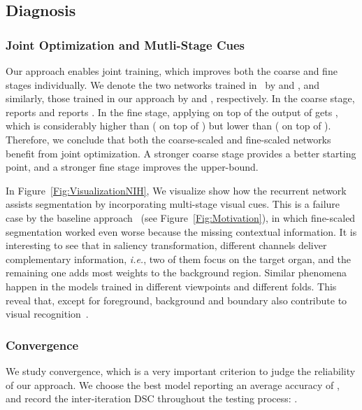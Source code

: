 \documentclass[10pt,twocolumn,letterpaper]{article}
\begin{document}
\subsection{Diagnosis}
\label{ExperimentsNIH:Diagnosis}


\subsubsection{Joint Optimization and Mutli-Stage Cues}
\label{ExperimentsNIH:Diagnosis:JointOptimization}

Our approach enables joint training, which improves both the coarse and fine stages individually.
We denote the two networks trained in~\cite{Zhou_2017_Fixed} by  and ,
and similarly, those trained in our approach by  and , respectively.
In the coarse stage,  reports  and  reports .
In the fine stage, applying  on top of the output of  gets ,
which is considerably higher than  ( on top of )
but lower than  ( on top of ).
Therefore, we conclude that both the coarse-scaled and fine-scaled networks benefit from joint optimization.
A stronger coarse stage provides a better starting point, and a stronger fine stage improves the upper-bound.

In Figure~\ref{Fig:VisualizationNIH},
We visualize show how the recurrent network assists segmentation by incorporating multi-stage visual cues.
This is a failure case by the baseline approach~\cite{Zhou_2017_Fixed} (see Figure~\ref{Fig:Motivation}),
in which fine-scaled segmentation worked even worse because the missing contextual information.
It is interesting to see that in saliency transformation, different channels deliver complementary information,
{\em i.e.}, two of them focus on the target organ, and the remaining one adds most weights to the background region.
Similar phenomena happen in the models trained in different viewpoints and different folds.
This reveal that, except for foreground, background and boundary also contribute to visual recognition~\cite{Zhu_2017_Object}.


\vspace{-0.2cm}
\subsubsection{Convergence}
\label{ExperimentsNIH:Diagnosis:Convergence}

We study convergence, which is a very important criterion to judge the reliability of our approach.
We choose the best model reporting an average accuracy of ,
and record the inter-iteration DSC throughout the testing process: .
\end{document}
